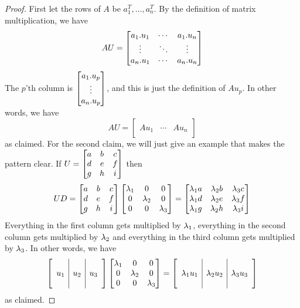 \documentclass[reqno]{amsart}
\theoremstyle{definition}
\begin{document}
\begin{proof}
 First let the rows of $A$ be $a_1^T,\dotsc,a_n^T$.  By the definition
 of matrix multiplication, we have
 \[ AU = 
     \left[\begin{matrix} 
      a_1.u_1 & \cdots & a_1.u_n \\
      \vdots  & \ddots & \vdots \\
      a_n.u_1 & \cdots & a_n.u_n
     \end{matrix}\right] 
 \]
 The $p$'th column is $\left[\begin{matrix} a_1.u_p \\ \vdots \\ a_n.u_p\end{matrix}\right]$, and
 this is just the definition of $Au_p$.  In other words, we have 
 \[ AU = \left[\begin{array}{c|c|c}
         && \\ Au_1 & \cdots & Au_n \\ &&
        \end{array}\right]
 \]
 as claimed.  For the second claim, we will just give an example that
 makes the pattern clear.  If $U=\left[\begin{matrix} a&b&c\\ d&e&f \\ g&h&i\end{matrix}\right]$ then 
 \[ UD = 
     \left[\begin{matrix} a&b&c\\ d&e&f \\ g&h&i\end{matrix}\right] 
     \left[\begin{matrix} \lambda_1 & 0 & 0 \\ 0 & \lambda_2 & 0 \\ 0 & 0 & \lambda_3 \end{matrix}\right] 
     =
     \left[\begin{matrix} 
      \lambda_1 a & \lambda_2 b & \lambda_3 c \\
      \lambda_1 d & \lambda_2 e & \lambda_3 f \\
      \lambda_1 g & \lambda_2 h & \lambda_3 i
     \end{matrix}\right]
 \]
 Everything in the first column gets multiplied by $\lambda_1$, everything
 in the second column gets multiplied by $\lambda_2$ and everything in the
 third column gets multiplied by $\lambda_3$.  In other words, we have
 \[ 
  \left[\begin{array}{c|c|c}
   && \\ u_1 & u_2 & u_3 \\ &&
  \end{array}\right]
  \left[\begin{matrix} \lambda_1 & 0 & 0 \\ 0 & \lambda_2 & 0 \\ 0 & 0 & \lambda_3 \end{matrix}\right]  =
  \left[\begin{array}{c|c|c}
   && \\ \lambda_1u_1 & \lambda_2u_2 & \lambda_3u_3 \\ &&
  \end{array}\right]
 \]
 as claimed.
\end{proof}
\end{document}
